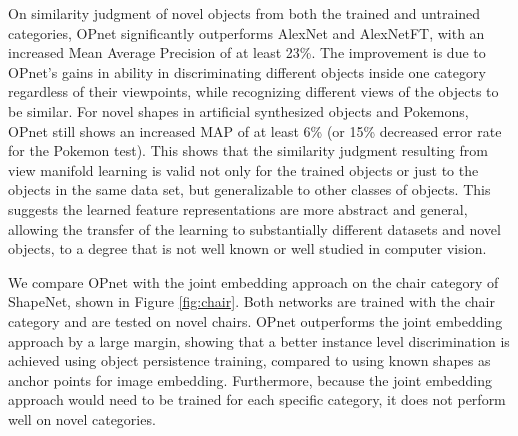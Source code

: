 \documentclass{article} %
\begin{document}
On similarity judgment of novel objects from both the trained and untrained categories, OPnet significantly outperforms AlexNet and AlexNetFT, with an increased Mean Average Precision of at least 23\%. The improvement is due to OPnet's gains in ability in discriminating different objects inside one category regardless of their viewpoints, while recognizing different views of the objects to be similar. For novel shapes in artificial synthesized objects and Pokemons, OPnet still shows an increased MAP of at least 6\% (or 15\% decreased error rate for the Pokemon test). This shows that the similarity judgment resulting from view manifold learning is valid not only for the trained objects or just to the objects in the same data set, but generalizable to other classes of objects. This suggests the learned feature representations are more abstract and general, allowing the transfer of the learning to substantially different datasets and novel objects, to a degree that is not well known or well studied in computer vision.

\begin{table}
\centering
{}

\caption{Mean Average Precision for the object instance retrieval task over all test sets.}
\label{table:map}
\end{table}

We compare OPnet with the joint embedding approach on the chair category of ShapeNet, shown in Figure \ref{fig:chair}. Both networks are trained with the chair category and are tested on novel chairs. OPnet outperforms the joint embedding approach by a large margin, showing that a better instance level discrimination is achieved using object persistence training, compared to using known shapes as anchor points for image embedding. Furthermore, because the joint embedding approach would need to be trained for each specific category, it does not perform well on novel categories.
\end{document}
